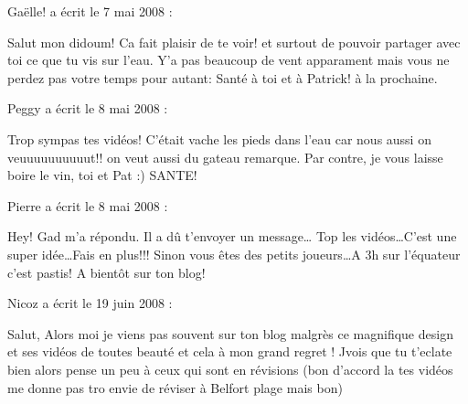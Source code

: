 \medskip
Gaëlle! a écrit le 7 mai 2008 :
\begin{displayquote}
Salut mon didoum!
Ca fait plaisir de te voir! et surtout de pouvoir partager avec toi ce que tu vis sur l'eau.
Y'a pas beaucoup de vent apparament mais vous ne perdez pas votre temps pour autant: Santé à toi et à Patrick!
à la prochaine.
\end{displayquote}

\medskip
Peggy a écrit le 8 mai 2008 :
\begin{displayquote}
Trop sympas tes vidéos!
C'était vache les pieds dans l'eau car nous aussi on veuuuuuuuuuut!! on veut aussi du gateau remarque.
Par contre, je vous laisse boire le vin, toi et Pat :) SANTE!
\end{displayquote}

\medskip
Pierre a écrit le 8 mai 2008 :
\begin{displayquote}
Hey!
Gad m'a répondu. Il a dû t'envoyer un message\dots
Top les vidéos\dots C'est une super idée\dots Fais en plus!!!
Sinon vous êtes des petits joueurs\dots A 3h sur l'équateur c'est pastis!
A bientôt sur ton blog!
\end{displayquote}

\medskip
Nicoz a écrit le 19 juin 2008 :
\begin{displayquote}
Salut,
Alors moi je viens pas souvent sur ton blog malgrès ce magnifique design et ses vidéos de toutes beauté et cela à mon grand regret !
Jvois que tu t'eclate bien alors pense un peu à ceux qui sont en révisions (bon d'accord la tes vidéos me donne pas tro envie de réviser à Belfort plage mais bon)
\end{displayquote}

\vfill
